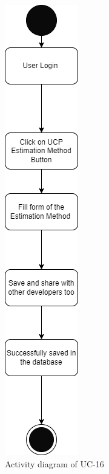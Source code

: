 \begin{figure}[H]
    \centering
    \includegraphics[scale=0.5]{./diagrams/Activity Diagram/ad-16.png}
    \caption{Activity diagram of UC-16}
    \label{fig:act-16}

\end{figure}


